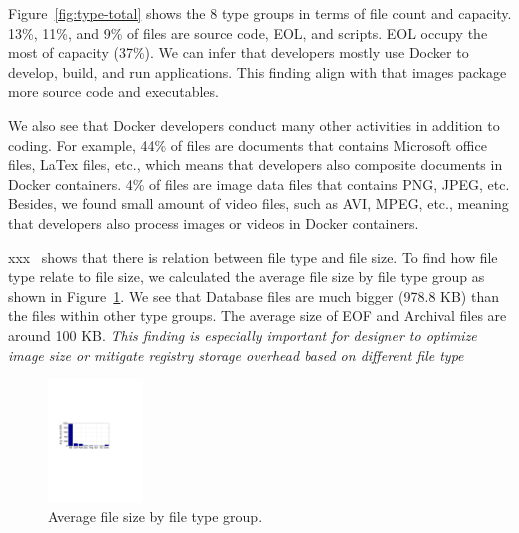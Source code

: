 Figure~\ref{fig:type-total} shows the 8 type groups in terms of file count and capacity.  
13\%, 11\%, and 9\% of files are source code, EOL, and scripts. 
EOL occupy the most of capacity (37\%). 
We can infer that developers mostly use Docker to develop, build, and run applications. This finding align with that images package more source code and executables.

We also see that Docker developers conduct many other activities in addition to coding. 
For example, 44\% of files are documents that contains Microsoft office files, LaTex files, etc., which means that developers also composite documents in Docker containers. 4\% of files are image data files that contains PNG, JPEG, etc. Besides, we found small amount of video files, such as AVI, MPEG, etc., meaning that developers also process images or videos in Docker containers.

xxx~\cite{xxxx} shows that there is relation between file type and file size. 
To find how file type relate to file size, we calculated the average file size by file type group as shown in
Figure~\ref{fig:type-total-avg-size}. We see that Database files are much bigger (978.8 KB) than the files within other type groups. The average size of EOF and Archival files are around 100 KB. 
\textit{This finding is especially important for designer to optimize image size or mitigate registry storage overhead based on different file type}


\begin{figure}[!t]
	\centering
	\includegraphics [width=0.225\textwidth]{graphs/type-total-avg-size}
	\caption{Average file size by file type group.}
	\label{fig:type-total-avg-size}
\end{figure}

